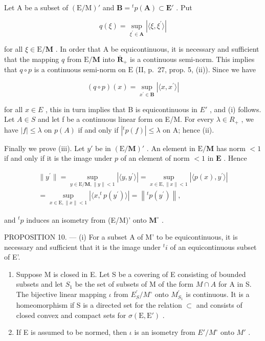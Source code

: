Let A be a subset of \((\mathrm{E}/\mathrm{M})'\) and \(\mathbf{B} = {}^{t}p(\mathbf{A}) \subset \mathbf{E}'\) . Put

\[
q (\xi) = \sup _ {\xi^ {\prime} \in \mathbf {A}} | \langle \xi , \xi^ {\prime} \rangle |
\]

for all \(\xi \in \mathrm{E} / \mathbf{M}\) . In order that A be equicontinuous, it is necessary and sufficient that the mapping \(q\) from \(\mathrm{E} / \mathbf{M}\) into \(\overline{\mathbf{R}}_+\) is a continuous semi-norm. This implies that \(q \circ p\) is a continuous semi-norm on \(\mathrm{E}\) (II, p.~27, prop. 5, (ii)). Since we have

\[
(q \circ p) (x) = \sup _ {x ^ {\prime} \in \mathbf {B}} | \langle x, x ^ {\prime} \rangle |
\]

for all \(x \in E\) , this in turn implies that B is equicontinuous in \(E'\) , and (i) follows. Let \(A \in S\) and let f be a continuous linear form on E/M. For every \(\lambda \in R_{+}\) , we have \(|f| \leqslant \lambda\) on \(p(A)\) if and only if \(|^{t}p(f)| \leqslant \lambda\) on A; hence (ii).

Finally we prove (iii). Let \(y'\) be in \((\mathrm{E} / \mathbf{M})'\) . An element in \(\mathrm{E} / \mathbf{M}\) has norm \(< 1\) if and only if it is the image under \(p\) of an element of norm \(< 1\) in \(\mathbf{E}\) . Hence

\[
\begin{array}{l} \| y ^ {\prime} \| = \sup _ {y \in \mathrm{E} / \mathbf {M}, \| y \| <   1} \left| \langle y, y ^ {\prime} \rangle \right| = \sup _ {x \in \mathrm{E}, \| x \| <   1} \left| \langle p (x), y ^ {\prime} \rangle \right| \\ = \sup _ {x \in \mathrm{E}, \| x \| <   1} \left| \langle x, ^ {t} p (y ^ {\prime}) \rangle \right| = \left\| ^ {t} p (y ^ {\prime}) \right\|, \end{array}
\]

and \({}^t p\) induces an isometry from (E/M)' onto \({\mathbf{M}}^{ \circ  }\) .

PROPOSITION 10. --- (i) For a subset A of M' to be equicontinuous, it is necessary and sufficient that it is the image under \({}^t i\) of an equicontinuous subset of E'.

\begin{enumerate}
\def\labelenumi{(\roman{enumi})}
\setcounter{enumi}{1}
\item
  Suppose M is closed in E. Let S be a covering of E consisting of bounded subsets and let \(S_{1}\) be the set of subsets of M of the form \(M \cap A\) for A in S. The bijective linear mapping \(\iota\) from \(E_{S}^{\prime}/M^{\circ}\) onto \(M_{S_{1}}^{\prime}\) is continuous. It is a homeomorphism if S is a directed set for the relation \(\subset\) and consists of closed convex and compact sets for \(\sigma(\mathrm{E}, \mathrm{E}')\) .
\item
  If E is assumed to be normed, then \(\iota\) is an isometry from \(E'/M^{\circ}\) onto \(M'\) .
\end{enumerate}

